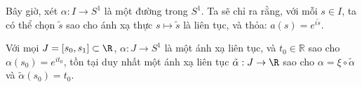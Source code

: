 	Bây giờ, xét $\alpha: I \to S^1$ là một đường trong $S^1$. 
	Ta sẽ chỉ ra rằng, với mỗi $s \in I$, ta có thể chọn $\tilde{s}$ sao cho ánh xạ thực $s \mapsto \tilde{s}$ là liên tục, và thỏa: $a(s) = e^{i\tilde{s}}.$
	
	\begin{proposition} Với mọi $J=[s_0,s_1]\subset \R$, $\alpha: J\to S^1$ là một ánh xạ liên tục, và $t_0\in \mathbb{R}$ sao cho $\alpha(s_0) = e^{it_0}$, %
	tồn tại duy nhất một ánh xạ liên tục $\tilde{\alpha}: J \to \R$ sao cho $\alpha = \xi \circ \tilde{\alpha}$ và 
	$\tilde{\alpha}(s_0) = t_0$.
	\end{proposition}
